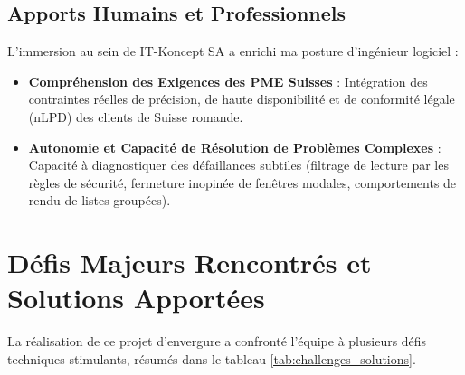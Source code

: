 \subsection{Apports Humains et Professionnels}
L'immersion au sein de IT-Koncept SA a enrichi ma posture d'ingénieur logiciel :
\begin{itemize}[leftmargin=1.5cm, label=\textcolor{odooPurple}{\small\textbullet}]
    \item \textbf{Compréhension des Exigences des PME Suisses} : Intégration des contraintes réelles de précision, de haute disponibilité et de conformité légale (nLPD) des clients de Suisse romande.
    \item \textbf{Autonomie et Capacité de Résolution de Problèmes Complexes} : Capacité à diagnostiquer des défaillances subtiles (filtrage de lecture par les règles de sécurité, fermeture inopinée de fenêtres modales, comportements de rendu de listes groupées).
\end{itemize}

\section{Défis Majeurs Rencontrés et Solutions Apportées}
La réalisation de ce projet d'envergure a confronté l'équipe à plusieurs défis techniques stimulants, résumés dans le tableau \ref{tab:challenges_solutions}.

